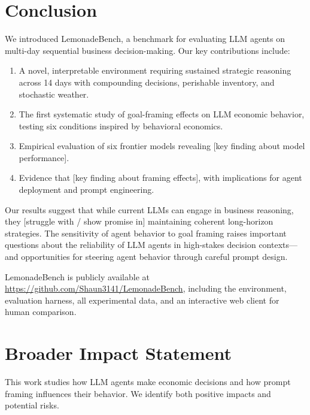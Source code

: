 \section{Conclusion}
\label{sec:conclusion}

We introduced LemonadeBench, a benchmark for evaluating LLM agents on multi-day sequential business decision-making. Our key contributions include:

\begin{enumerate}
    \item A novel, interpretable environment requiring sustained strategic reasoning across 14 days with compounding decisions, perishable inventory, and stochastic weather.
    
    \item The first systematic study of goal-framing effects on LLM economic behavior, testing six conditions inspired by behavioral economics.
    
    \item Empirical evaluation of six frontier models revealing [key finding about model performance].
    
    \item Evidence that [key finding about framing effects], with implications for agent deployment and prompt engineering.
\end{enumerate}

Our results suggest that while current LLMs can engage in business reasoning, they [struggle with / show promise in] maintaining coherent long-horizon strategies. The sensitivity of agent behavior to goal framing raises important questions about the reliability of LLM agents in high-stakes decision contexts---and opportunities for steering agent behavior through careful prompt design.

LemonadeBench is publicly available at \url{https://github.com/Shaun3141/LemonadeBench}, including the environment, evaluation harness, all experimental data, and an interactive web client for human comparison.

\section*{Broader Impact Statement}

This work studies how LLM agents make economic decisions and how prompt framing influences their behavior. We identify both positive impacts and potential risks.

